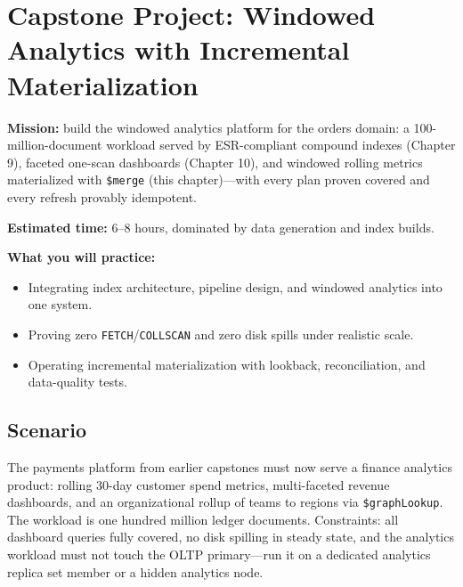 \section{Capstone Project: Windowed Analytics with Incremental Materialization}\label{sec:ch11-capstone}

\begin{capstonebox}
\textbf{Mission:} build the windowed analytics platform for the orders domain: a 100-million-document workload served by ESR-compliant compound indexes (Chapter 9), faceted one-scan dashboards (Chapter 10), and windowed rolling metrics materialized with \texttt{\$merge} (this chapter)---with every plan proven covered and every refresh provably idempotent.

\textbf{Estimated time:} 6--8 hours, dominated by data generation and index builds.

\textbf{What you will practice:}
\begin{itemize}
    \item Integrating index architecture, pipeline design, and windowed analytics into one system.
    \item Proving zero \texttt{FETCH}/\texttt{COLLSCAN} and zero disk spills under realistic scale.
    \item Operating incremental materialization with lookback, reconciliation, and data-quality tests.
\end{itemize}
\end{capstonebox}

\subsection*{Scenario}
The payments platform from earlier capstones must now serve a finance analytics product: rolling 30-day customer spend metrics, multi-faceted revenue dashboards, and an organizational rollup of teams to regions via \texttt{\$graphLookup}. The workload is one hundred million ledger documents. Constraints: all dashboard queries fully covered, no disk spilling in steady state, and the analytics workload must not touch the OLTP primary---run it on a dedicated analytics replica set member or a hidden analytics node.

